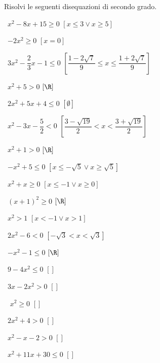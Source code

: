 \begin{esercizio}[\Ast]
 \label{ese:4.4}
Risolvi le seguenti disequazioni di secondo grado.
\vspace{\dy}
\begin{multicols}{2}
 \begin{enumeratea}
 \item~\(x^2-8x+15\ge 0\) \hfill \(\left[x\le 3\vee x\ge 5\right]\)
 \item~\(-2x^2\ge 0\) \hfill \(\left[x=0\right]\)
 \item~\(3x^2-\dfrac 2 3x-1\le 0\) 
  \hfill \(\left[\dfrac{1-2\sqrt 7} 9\le x\le \dfrac{1+2\sqrt 7} 9\right]\)
 \item~\(x^2+5>0\) \hfill \(\left[\R\right]\)
 \item~\(2x^2+5x+4\le 0\) \hfill \(\left[\emptyset\right]\)
 \item~\(x^2-3x-\dfrac 5 2<0\) 
  \hfill \(\left[\dfrac{3-\sqrt{19}} 2<x<\dfrac{3+\sqrt{19}} 2\right]\)
 \item~\(x^2+1>0\) \hfill \(\left[\R\right]\)
 \item~\(-x^2+5\le 0\) \hfill \(\left[x\le -\sqrt 5\vee x\ge \sqrt 5\right]\)
 \item~\(x^2+x\ge 0\) \hfill \(\left[x\le -1\vee x\ge 0\right]\)
 \item~\((x+1)^2\ge 0\) \hfill \(\left[\R\right]\)
 \item~\(x^2>1\) \hfill \(\left[x<-1\vee x>1\right]\)
 \item~\(2x^2-6<0\) \hfill \(\left[-\sqrt 3<x<\sqrt 3\right]\)
 \item~\(-x^2-1\le 0\) \hfill \(\left[\R\right]\)
 \item~\(9-4x^2\le 0\) \hfill \(\left[\right]\)
 \item~\(3x-2x^2>0\) \hfill \(\left[\right]\)
 \item~ \(x^2\ge 0\) \hfill \(\left[\right]\)
 \item~\(2x^2+4>0\) \hfill \(\left[\right]\)
 \item~\(x^2-x-2>0\) \hfill \(\left[\right]\)
 \item~\(x^2+11x+30\le 0\) \hfill \(\left[\right]\)
 \end{enumeratea}
 \end{multicols}
\end{esercizio}

